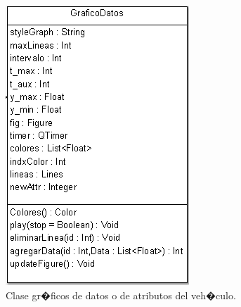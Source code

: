 \begin{figure}[h!]
	\centering
	\includegraphics[width=0.3\linewidth, height=0.2\textheight]{Imagenes/classGraficoDatos}
	\caption{Clase gr�ficos de datos o de atributos del veh�culo.}
	\label{fig:classgraficodatos}
\end{figure}

